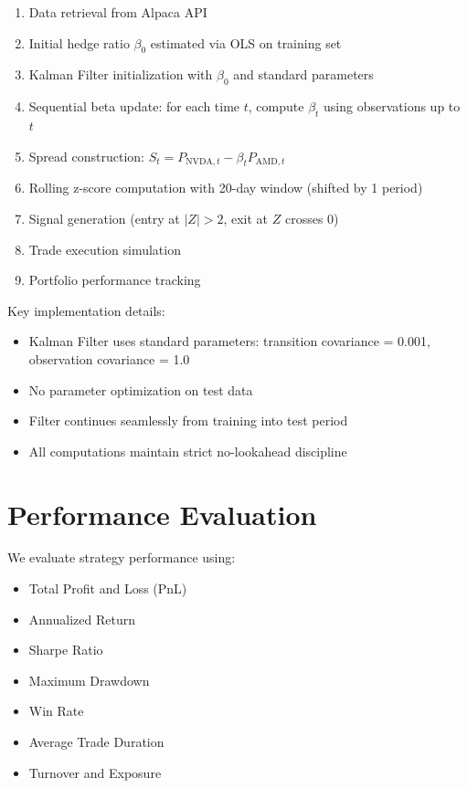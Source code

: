 \documentclass[11pt]{article}
\begin{document}
\begin{enumerate}
\item Data retrieval from Alpaca API
\item Initial hedge ratio $\beta_0$ estimated via OLS on training set
\item Kalman Filter initialization with $\beta_0$ and standard parameters
\item Sequential beta update: for each time $t$, compute $\beta_t$ using observations up to $t$
\item Spread construction: $S_t = P_{\text{NVDA},t} - \beta_t P_{\text{AMD},t}$
\item Rolling z-score computation with 20-day window (shifted by 1 period)
\item Signal generation (entry at $|Z| > 2$, exit at $Z$ crosses 0)
\item Trade execution simulation
\item Portfolio performance tracking
\end{enumerate}

Key implementation details:
\begin{itemize}
\item Kalman Filter uses standard parameters: transition covariance = 0.001, observation covariance = 1.0
\item No parameter optimization on test data
\item Filter continues seamlessly from training into test period
\item All computations maintain strict no-lookahead discipline
\end{itemize}

\section{Performance Evaluation}

We evaluate strategy performance using:

\begin{itemize}
\item Total Profit and Loss (PnL)
\item Annualized Return
\item Sharpe Ratio
\item Maximum Drawdown
\item Win Rate
\item Average Trade Duration
\item Turnover and Exposure
\end{itemize}
\end{document}
